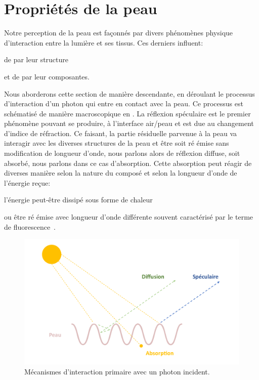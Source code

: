 \section{Propriétés de la peau}
Notre perception de la peau est façonnés par divers phénomènes physique d'interaction entre la lumière et ses tissus. Ces derniers influent: 
\begin{inlinerate}
\item de par leur structure 
\item et de par leur composantes.
\end{inlinerate}
Nous aborderons cette section de manière descendante, en déroulant le processus d'interaction d'un photon qui entre en contact avec la peau. Ce processus est schématisé de manière macroscopique en . La réflexion spéculaire est le premier phénomène pouvant se produire, à l'interface air/peau et est due au changement d'indice de réfraction. Ce faisant, la partie résiduelle parvenue à la peau va interagir avec les diverses structures de la peau et être soit ré émise sans modification de longueur d'onde, nous parlons alors de réflexion diffuse, soit absorbé, nous parlons dans ce cas d'absorption. Cette absorption peut réagir de diverses manière selon la nature du composé et selon la longueur d'onde de l'énergie reçue: 
\begin{inlinerate}
\item l'énergie peut-être dissipé sous forme de chaleur
\item ou être ré émise avec longueur d'onde différente souvent caractérisé par le terme de fluorescence~\cite{Kollias2002}.
\end{inlinerate}\par

\begin{figure}[H]
    \centering
    \includegraphics[width=\linewidth]{contents/chapter_2/resources/light_interaction.pdf}
    \caption{Mécanismes d'interaction primaire avec un photon incident.}
    \label{fig:light_interaction}
\end{figure}\par

